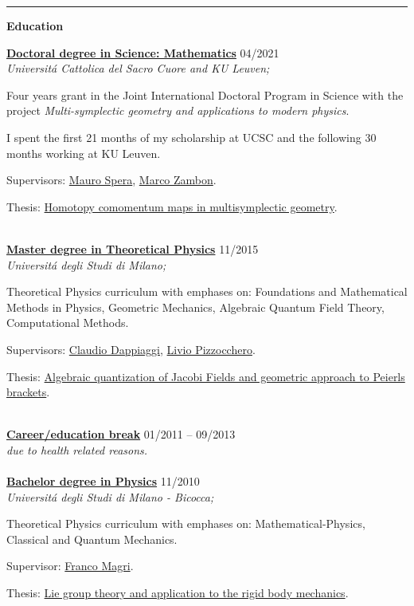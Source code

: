 \documentclass[a4paper]{article}
\newcommand{\block}[1]{\hrule \vspace{0.2cm} \textbf{\Large #1} \vspace{0.2cm}}
\newcommand{\voice}[5]{\href{#4}{\textbf{#1}} \hfill #2 \\ \textit{#3} \\ {\small #5} \vspace{0.2cm} \\}
\begin{document}
\begin{minipage}[t]{0.6\columnwidth}


    \block{Education}

    
    \voice{Doctoral degree in Science: Mathematics}
        {04/2021}
        {Universit\'a Cattolica del Sacro Cuore and KU Leuven;}
        {https://web.archive.org/save/http://scuoledidottorato.unicatt.it/phdschools/science-research-projects}       
        {Four years grant in the Joint International Doctoral Program in Science with the project \emph{Multi-symplectic geometry and applications to modern physics}. \par I spent the first 21 months of my scholarship at UCSC and the following 30 months working at KU Leuven. \par Supervisors: \href{http://docenti.unicatt.it/ita/mauro_spera/}{Mauro Spera}, \href{https://perswww.kuleuven.be/~u0096206/}{Marco Zambon}. \par Thesis: \href{https://limo.libis.be/primo-explore/fulldisplay?docid=LIRIAS3408626&context=L&vid=KULeuven&search_scope=ALL_CONTENT&tab=all_content_tab&lang=en_US}{Homotopy comomentum maps in multisymplectic geometry}.}
    \voice{Master degree in Theoretical Physics}
        {11/2015}
        {Universit\'a degli Studi di Milano;}
        {https://fisica-lm.cdl.unimi.it/it}       
        {Theoretical Physics curriculum with emphases on: Foundations and Mathematical Methods in Physics, Geometric Mechanics, Algebraic Quantum Field Theory, Computational Methods. \par Supervisors: \href{http://fisica.unipv.it/personale/Persona.php?ID=256}{Claudio Dappiaggi}, \href{http://users.mat.unimi.it/users/pizzocchero/}{Livio Pizzocchero}. \par Thesis: \href{https://www.researchgate.net/publication/295548746_Algebraic_quantization_of_Jacobi_fields_and_geometric_approach_to_Peierls_brackets}{Algebraic quantization of Jacobi Fields and geometric approach to Peierls brackets}.}
    \voice{Career/education break}
        {01/2011 -- 09/2013}
        {due to health related reasons.}
        {}       
        {\vspace{-0.25cm}}
    \voice{Bachelor degree in Physics}
        {11/2010}
        {Universit\'a degli Studi di Milano - Bicocca;}
        {https://www.fisica.unimib.it/en}       
        {Theoretical Physics curriculum with emphases on: Mathematical-Physics, Classical and Quantum Mechanics. \par Supervisor: \href{http://staff.matapp.unimib.it/~/magri/}{Franco Magri}. \par Thesis: \href{https://github.com/MasterToninus/TesiTriennale/blob/master/tesi.pdf}{Lie group theory and application to the rigid body mechanics}.}




\end{minipage} 
\end{document}
